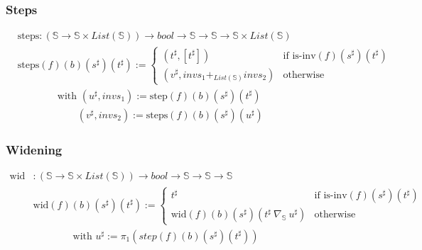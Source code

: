 \documentclass{beamer}
\begin{document}
        \begin{frame}
            \frametitle{Steps}
            \begin{align*}
                &\text{steps} : (\mathbb{S} \to \mathbb{S} \times List(\mathbb{S})) \to bool \to \mathbb{S} \to \mathbb{S} \to \mathbb{S} \times List(\mathbb{S}) \\
                &\text{steps} (f) (b) (s^{\sharp}) (t^{\sharp}) := \begin{cases}
                                                                (t^{\sharp}, [t^{\sharp}]) & \text{if } \text{is-inv} (f) (s^{\sharp}) (t^{\sharp}) \\
                                                                (v^{\sharp}, invs_1 +_{List(\mathbb{S})} invs_2) & \text{otherwise}
                                                            \end{cases} \\
            & \qquad \qquad \text{with } (u^{\sharp}, invs_1) := \text{step} (f) (b) (s^{\sharp}) (t^{\sharp}) \\
            & \qquad \qquad \qquad (v^{\sharp}, invs_2) := \text{steps} (f) (b) (s^{\sharp}) (u^{\sharp})
            \end{align*}
        \end{frame}

        \begin{frame}
            \frametitle{Widening}
            \begin{align*}
                \text{wid} &: (\mathbb{S} \to \mathbb{S} \times List(\mathbb{S})) \to bool \to \mathbb{S} \to \mathbb{S} \to \mathbb{S} \\
                &\text{wid} (f) (b) (s^{\sharp}) (t^{\sharp}) := \begin{cases}
                                                                t^{\sharp} & \text{if } \text{is-inv} (f) (s^{\sharp}) (t^{\sharp}) \\
                                                                \text{wid} (f) (b) (s^{\sharp}) (t^{\sharp}\ \nabla_\mathbb{S}\ u^{\sharp}) & \text{otherwise}
                                                            \end{cases} \\
                & \qquad \qquad \text{with } u^{\sharp} := \pi_1 (step (f) (b) (s^{\sharp}) (t^{\sharp}))
            \end{align*}
            
        \end{frame}
\end{document}
